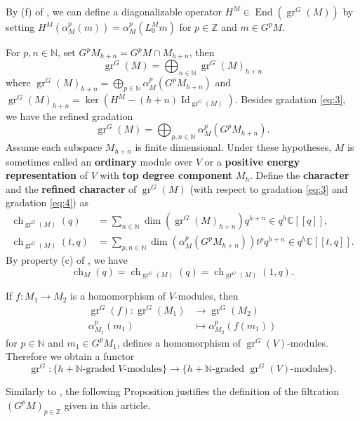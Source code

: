 \documentclass[12pt, reqno]{amsart}
\theoremstyle{remark}
\DeclareMathOperator{\Id}{Id}
\DeclareMathOperator{\gr}{gr}
\DeclareMathOperator{\End}{End}
\DeclareMathOperator{\ch}{ch}
\begin{document}
By (f) of , we can define a diagonalizable operator $H^M \in \End(\gr^G(M))$ by setting $H^M(\alpha^p_M(m)) = \alpha^p_M(L^M_0m)$ for $p \in \mathbb{Z}$ and $m \in G^pM$.

For $p, n \in \mathbb{N}$, set $G^pM_{h + n} = G^pM \cap M_{h + n}$, then
\begin{equation}
  \label{eq:3}
  \gr^G(M) = \bigoplus_{n \in \mathbb{N}}\gr^G(M)_{h + n}
\end{equation}
where $\gr^G(M)_{h + n} = \bigoplus_{p \in \mathbb{N}}\alpha^p_M(G^pM_{h + n})$ and $\gr^G(M)_{h + n} = \ker(H^M - (h + n)\Id_{\gr^G(M)})$.
Besides gradation \eqref{eq:3}, we have the refined gradation
\begin{equation}
  \label{eq:4}
  \gr^G(M) = \bigoplus_{p, n \in \mathbb{N}}\alpha^p_M(G^pM_{h + n}).
\end{equation}
Assume each subspace $M_{h + n}$ is finite dimensional.
Under these hypotheses, $M$ is sometimes called an \textbf{ordinary} module over $V$ or  a \textbf{positive energy representation} of $V$ with \textbf{top degree component} $M_h$.
Define the \textbf{character} and the \textbf{refined character} of $\gr^G(M)$ (with respect to gradation \eqref{eq:3} and gradation \eqref{eq:4}) as
\begin{align*}
  \ch_{\gr^G(M)}(q) &= \sum_{n \in \mathbb{N}}\dim(\gr^G(M)_{h + n})q^{h + n} \in q^h\mathbb{C}[[q]],\\
  \ch_{\gr^G(M)}(t, q) &= \sum_{p, n \in \mathbb{N}}\dim(\alpha^p_M(G^pM_{h + n}))t^pq^{h + n} \in q^{h}\mathbb{C}[[t, q]].
\end{align*}
By property (c) of , we have
\begin{equation*}
  \ch_M(q) = \ch_{\gr^G(M)}(q) = \ch_{\gr^G(M)}(1, q).
\end{equation*}

If $f: M_1 \to M_2$ is a homomorphism of $V$-modules, then
\begin{align*}
  \gr^G(f): \gr^G(M_1) &\to \gr^G(M_2) \\
  \alpha^p_{M_1}(m_1) &\mapsto \alpha^p_{M_2}(f(m_1))
\end{align*}
for $p \in \mathbb{N}$ and $m_1\in G^pM_1$, defines a homomorphism of $\gr^G(V)$-modules.
Therefore we obtain a functor
\begin{equation*}
  \gr^G: \{\text{$h + \mathbb{N}$-graded $V$-modules}\} \to \{\text{$h + \mathbb{N}$-graded $\gr^G(V)$-modules}\}.
\end{equation*}

Similarly to , the following Proposition justifies the definition of the filtration $(G^pM)_{p \in \mathbb{Z}}$ given in this article.
\end{document}
